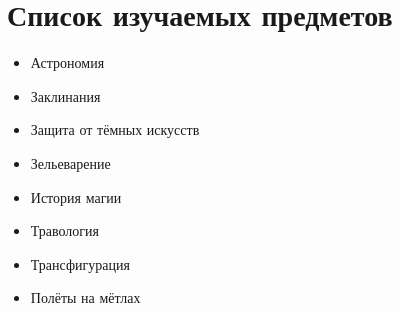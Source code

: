 \documentclass[14pt, a4paper]{article}
\begin{document}
\section{Список изучаемых предметов}
\begin{itemize}
\item Астрономия
\item Заклинания
\item Защита от тёмных искусств
\item Зельеварение
\item История магии
\item Травология
\item Трансфигурация
\item Полёты на мётлах
\end{itemize}
\end{document}
